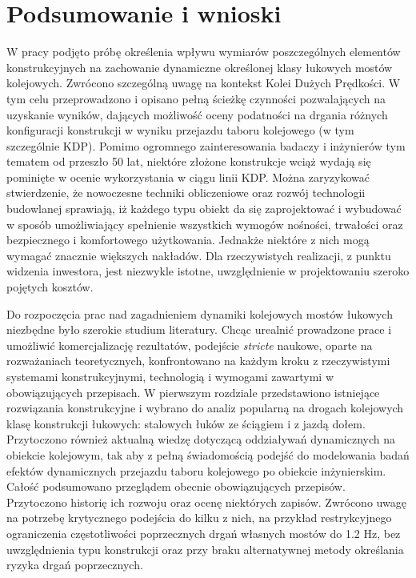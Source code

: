 \chapter*{Podsumowanie i wnioski}

W pracy podjęto próbę określenia wpływu wymiarów poszczególnych elementów konstrukcyjnych na zachowanie dynamiczne określonej klasy łukowych mostów kolejowych. Zwrócono szczególną uwagę na kontekst Kolei Dużych Prędkości. W tym celu przeprowadzono i opisano pełną ścieżkę czynności pozwalających na uzyskanie wyników, dających możliwość oceny podatności na drgania różnych konfiguracji konstrukcji w wyniku przejazdu taboru kolejowego (w tym szczególnie KDP). Pomimo ogromnego zainteresowania badaczy i inżynierów tym tematem od przeszło 50 lat, niektóre złożone konstrukcje wciąż wydają się pominięte w ocenie wykorzystania w ciągu linii KDP. Można zaryzykować stwierdzenie, że nowoczesne techniki obliczeniowe oraz rozwój technologii budowlanej sprawiają, iż każdego typu obiekt da się zaprojektować i wybudować w sposób umożliwiający spełnienie wszystkich wymogów nośności, trwałości oraz bezpiecznego i komfortowego użytkowania. Jednakże niektóre z nich mogą wymagać znacznie większych nakładów. Dla rzeczywistych realizacji, z punktu widzenia inwestora, jest niezwykle istotne, uwzględnienie w projektowaniu  szeroko pojętych kosztów.

Do rozpoczęcia prac nad zagadnieniem dynamiki kolejowych mostów łukowych niezbędne było szerokie studium literatury. Chcąc urealnić prowadzone prace i umożliwić komercjalizację rezultatów, podejście \textit{stricte} naukowe, oparte na rozważaniach teoretycznych, konfrontowano na każdym kroku z rzeczywistymi systemami konstrukcyjnymi, technologią i wymogami zawartymi w obowiązujących przepisach. W pierwszym rozdziale przedstawiono istniejące rozwiązania konstrukcyjne i wybrano do analiz popularną na drogach kolejowych klasę konstrukcji łukowych: stalowych łuków ze ściągiem i z jazdą dołem. Przytoczono również aktualną wiedzę dotyczącą oddziaływań dynamicznych na obiekcie kolejowym, tak aby z pełną świadomością podejść do modelowania badań efektów dynamicznych przejazdu taboru kolejowego po obiekcie inżynierskim. Całość podsumowano przeglądem obecnie obowiązujących przepisów. Przytoczono historię ich rozwoju oraz ocenę niektórych zapisów. Zwrócono uwagę na potrzebę krytycznego podejścia do kilku z nich, na przykład restrykcyjnego ograniczenia częstotliwości poprzecznych drgań własnych mostów do 1.2 Hz, bez uwzględnienia typu konstrukcji oraz przy braku alternatywnej metody określania ryzyka drgań poprzecznych.

